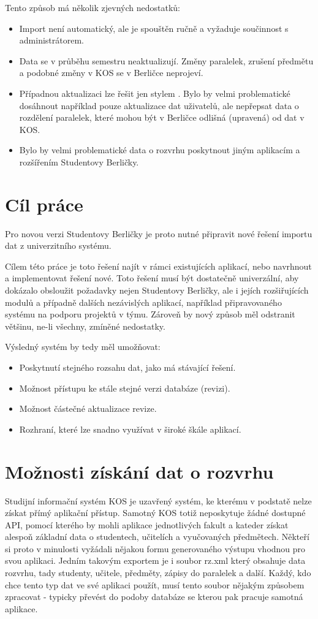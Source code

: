 \documentclass[11pt,twoside,a4paper]{book}
\begin{document}
Tento způsob má několik zjevných nedostatků:
\begin{itemize}
\item Import není automatický, ale je spouštěn ručně a vyžaduje součinnost s administrátorem.
\item Data se v průběhu semestru neaktualizují. Změny paralelek, zrušení předmětu a podobné změny v KOS se v Berličce neprojeví.
\item Případnou aktualizaci lze řešit jen stylem . Bylo by velmi problematické dosáhnout například pouze aktualizace dat uživatelů, ale nepřepsat data o rozdělení paralelek, které mohou být v Berličce odlišná (upravená) od dat v KOS.
\item Bylo by velmi problematické data o rozvrhu poskytnout jiným aplikacím a rozšířením Studentovy Berličky.
\end{itemize}

\section{Cíl práce}
Pro novou verzi Studentovy Berličky je proto nutné připravit nové řešení importu dat z univerzitního systému.

Cílem této práce je toto řešení najít v rámci existujících aplikací, nebo navrhnout a implementovat řešení nové. Toto řešení musí být dostatečně univerzální, aby dokázalo obsloužit požadavky nejen Studentovy Berličky, ale i jejích rozšiřujících modulů a případně dalších nezávislých aplikací, například připravovaného systému na podporu projektů v týmu. Zároveň by nový způsob měl odstranit většinu, ne-li všechny, zmíněné nedostatky.

Výsledný systém by tedy měl umožňovat:
\begin{itemize}
\item Poskytnutí stejného rozsahu dat, jako má stávající řešení.
\item Možnost přístupu ke stále stejné verzi databáze (revizi).
\item Možnost částečné aktualizace revize.
\item Rozhraní, které lze snadno využívat v široké škále aplikací.
\end{itemize}

\section{Možnosti získání dat o rozvrhu}

Studijní informační systém KOS je uzavřený systém, ke kterému v podstatě nelze získat přímý aplikační přístup. Samotný KOS totiž neposkytuje žádné dostupné API, pomocí kterého by mohli aplikace jednotlivých fakult a kateder získat alespoň základní data o studentech, učitelích a vyučovaných předmětech. Někteří si proto v minulosti vyžádali nějakou formu generovaného výstupu vhodnou pro svou aplikaci. Jedním takovým exportem je i soubor rz.xml který obsahuje data rozvrhu, tady studenty, učitele, předměty, zápisy do paralelek a další. Každý, kdo chce tento typ dat ve své aplikaci použít, musí tento soubor nějakým způsobem zpracovat - typicky převést do podoby databáze se kterou pak pracuje samotná aplikace. 
\end{document}
